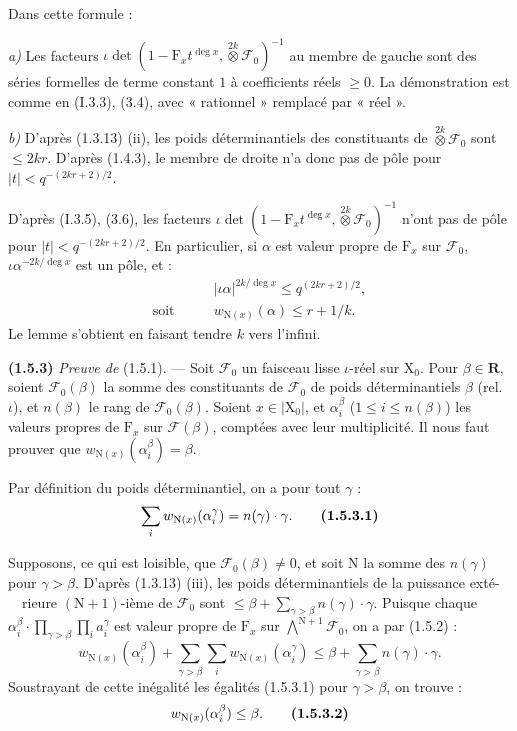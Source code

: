 \documentclass[11pt,leqno]{article}
\newcommand{\Page}[1]{\ifvmode\noindent\else\unskip\ \fi{\footnotesize\textcolor{gray}{[p.\,#1]}}\ \ignorespaces}
\begin{document}
Dans cette formule :

\textit{a)} Les facteurs \(\iota\det(1-\mathrm{F}_x t^{\deg x},\mathop{\otimes}\limits^{2k}\mathcal{F}_0)^{-1}\) au membre de gauche sont des séries formelles de terme constant \(1\) à coefficients réels \(\ge0\). La démonstration est comme en (I.3.3), (3.4), avec « rationnel » remplacé par « réel ».

\textit{b)} D’après (1.3.13) (ii), les poids déterminantiels des constituants de \(\mathop{\otimes}\limits^{2k}\mathcal{F}_0\) sont \(\le2kr\). D’après (1.4.3), le membre de droite n’a donc pas de pôle pour \(|t|<q^{-(2kr+2)/2}\).

D’après (I.3.5), (3.6), les facteurs \(\iota\det(1-\mathrm{F}_x t^{\deg x},\mathop{\otimes}\limits^{2k}\mathcal{F}_0)^{-1}\) n’ont pas de pôle pour \(|t|<q^{-(2kr+2)/2}\). En particulier, si \(\alpha\) est valeur propre de \(\mathrm{F}_x\) sur \(\mathcal{F}_0\), \(\iota\alpha^{-2k/\deg x}\) est un pôle, et :
\begin{align*}
&|\iota\alpha|^{2k/\deg x}\le q^{(2kr+2)/2},\\
\text{soit}\qquad &w_{\mathrm{N}(x)}(\alpha)\le r+1/k.
\end{align*}
Le lemme s’obtient en faisant tendre \(k\) vers l’infini.

\textbf{(1.5.3)} \textit{Preuve de} (1.5.1). — Soit \(\mathcal{F}_0\) un faisceau lisse \(\iota\)-réel sur \(\mathrm{X}_0\). Pour \(\beta\in\mathbf{R}\), soient \(\mathcal{F}_0(\beta)\) la somme des constituants de \(\mathcal{F}_0\) de poids déterminantiels \(\beta\) (rel. \(\iota\)), et \(n(\beta)\) le rang de \(\mathcal{F}_0(\beta)\). Soient \(x\in|\mathrm{X}_0|\), et \(\alpha_i^\beta\) (\(1\le i\le n(\beta)\)) les valeurs propres de \(\mathrm{F}_x\) sur \(\mathcal{F}(\beta)\), comptées avec leur multiplicité. Il nous faut prouver que \(w_{\mathrm{N}(x)}(\alpha_i^\beta)=\beta\).

Par définition du poids déterminantiel, on a pour tout \(\gamma\) :
\[
\sum_i w_{\mathrm{N}(x)}(\alpha_i^\gamma)=n(\gamma)\cdot\gamma.
\tag*{\textbf{(1.5.3.1)}}
\]

Supposons, ce qui est loisible, que \(\mathcal{F}_0(\beta)\ne0\), et soit \(\mathrm{N}\) la somme des \(n(\gamma)\) pour \(\gamma>\beta\). D’après (1.3.13) (iii), les poids déterminantiels de la puissance exté-\Page{165}rieure \((\mathrm{N}+1)\)-ième de \(\mathcal{F}_0\) sont \(\le\beta+\sum\limits_{\gamma>\beta}n(\gamma)\cdot\gamma\). Puisque chaque \(\alpha_i^\beta\cdot\prod\limits_{\gamma>\beta}\prod\limits_i a_i^\gamma\) est valeur propre de \(\mathrm{F}_x\) sur \(\bigwedge\limits^{\mathrm{N}+1}\mathcal{F}_0\), on a par (1.5.2) :
\[
w_{\mathrm{N}(x)}(\alpha_i^\beta)
+\sum_{\gamma>\beta}\sum_i w_{\mathrm{N}(x)}(\alpha_i^\gamma)
\le\beta+\sum_{\gamma>\beta}n(\gamma)\cdot\gamma.
\]
Soustrayant de cette inégalité les égalités (1.5.3.1) pour \(\gamma>\beta\), on trouve :
\[
w_{\mathrm{N}(x)}(\alpha_i^\beta)\le\beta.
\tag*{\textbf{(1.5.3.2)}}
\]
\end{document}
